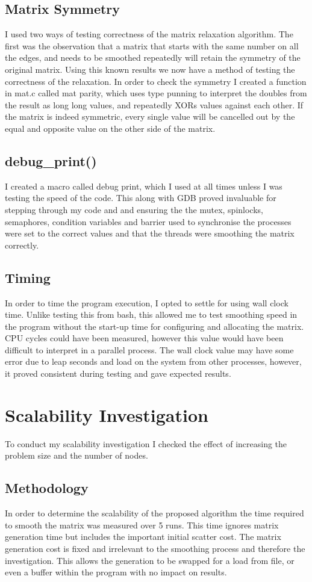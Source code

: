 \documentclass[a4paper,10pt]{report}
\begin{document}
\subsection{Matrix Symmetry}
I used two ways of testing correctness of the matrix relaxation algorithm. The first was the observation that a matrix that starts with the same number on all the edges, and needs to be smoothed repeatedly will retain the symmetry of the original matrix. Using this known results we now have a method of testing the correctness of the relaxation. In order to check the symmetry I created a function in mat.c called mat parity, which uses type punning to interpret the doubles from the result as long long values, and repeatedly XORs values against each other. If the matrix is indeed symmetric, every single value will be cancelled out by the equal and opposite value on the other side of the matrix.
\subsection{debug\_print()}
I created a macro called debug print, which I used at all times unless I was testing the speed of the code. This along with GDB proved invaluable for stepping through my code and and ensuring the the mutex, spinlocks, semaphores, condition variables and barrier used to synchronise the processes were set to the correct values and that the threads were smoothing the matrix correctly.
\subsection{Timing}
In order to time the program execution, I opted to settle for using wall clock time. Unlike testing this from bash, this allowed me to test smoothing speed in the program without the start-up time for configuring and allocating the matrix. CPU cycles could have been measured, however this value would have been difficult to interpret in a parallel process. The wall clock value may have some error due to leap seconds and load on the system from other processes, however, it proved consistent during testing and gave expected results.

\section{Scalability Investigation}
To conduct my scalability investigation I checked the effect of increasing the problem size and the number of nodes.
\subsection{Methodology}
In order to determine the scalability of the proposed algorithm the time required to smooth the matrix was measured over 5 runs. This time ignores matrix generation time but includes the important initial scatter cost. The matrix generation cost is fixed and irrelevant to the smoothing process and therefore the investigation. This allows the generation to be swapped for a load from file, or even a buffer within the program with no impact on results.
\end{document}
